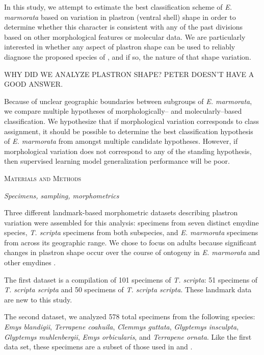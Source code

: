 \documentclass[12pt,letterpaper]{article}
\renewcommand{\section}[1]{%
\bigskip
\begin{center}
\begin{Large}
\normalfont\scshape #1
\medskip
\end{Large}
\end{center}}
\renewcommand{\subsection}[1]{%
\bigskip
\begin{center}
\begin{large}
\normalfont\itshape #1
\end{large}
\end{center}}
\begin{document}
In this study, we attempt to estimate the best classification scheme of \textit{E. marmorata} based on variation in plastron (ventral shell) shape in order to determine whether this character is consistent with any of the past divisions based on other morphological features or molecular data. We are particularly interested in whether any aspect of plastron shape can be used to reliably diagnose the proposed species of \citet{Spinks2014}, and if so, the nature of that shape variation.

\uppercase{Why did we analyze plastron shape? Peter doesn't have a good answer.}

Because of unclear geographic boundaries between subgroups of \textit{E. marmorata}, we compare multiple hypotheses of morphologically-- and molecularly--based classification. We hypothesize that if morphological variation corresponds to class assignment, it should be possible to determine the best classification hypothesis of \textit{E. marmorata} from amongst multiple candidate hypotheses. However, if morphological variation does not correspond to any of the standing hypothesis, then supervised learning model generalization performance will be poor.


\section{Materials and Methods}
\subsection{Specimens, sampling, morphometrics}
Three different landmark-based morphometric datasets describing plastron variation were assembled for this analysis: specimens from seven distinct emydine species, \textit{T. scripta} specimens from both subspecies, and \textit{E. marmorata} specimens from across its geographic range. We chose to focus on adults because significant changes in plastron shape occur over the course of ontogeny in \textit{E. marmorata} and other emydines \citep{Angielczyk2013a}.

The first dataset is a compilation of 101 specimens of \textit{T. scripta}: 51 specimens of \textit{T. scripta scripta} and 50 specimens of \textit{T. scripta scripta}. These landmark data are new to this study. 

The second dataset, we analyzed 578 total specimens from the following species: \textit{Emys blandigii}, \textit{Terrapene coahuila}, \textit{Clemmys guttata}, \textit{Glyptemys insculpta}, \textit{Glyptemys muhlenbergii}, \textit{Emys orbicularis}, and \textit{Terrapene ornata}. Like the first data set, these specimens are a subset of those used in \citet{Angielczyk2011} and \citet{Angielczyk2013a}.
\end{document}
